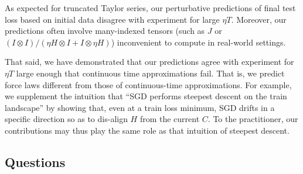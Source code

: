 \documentclass{article}
\theoremstyle{plain}
\theoremstyle{definition}
\begin{document}
        As expected for truncated Taylor series, our perturbative predictions
        of final test loss based on initial data disagree with experiment for
        large $\eta T$.  Moreover, our predictions often involve many-indexed
        tensors (such as $J$ or $(I\otimes I)/(\eta H \otimes I + I \otimes
        \eta H)$) inconvenient to compute in real-world settings. 
        
        That said, we have demonstrated that our predictions agree with
        experiment for $\eta T$ large enough that continuous time
        approximations fail.  That is, we predict force laws different from
        those of continuous-time approximations.  For example, we supplement
        the intuition that ``SGD performs steepest descent on the train
        landscape'' by showing that, even at a train loss minimum, SGD drifts
        in a specific direction so as to dis-align $H$ from the current $C$.
        To the practitioner, our contributions may thus play the same role as
        that intuition of steepest descent.

    \subsection{Questions}

\end{document}

